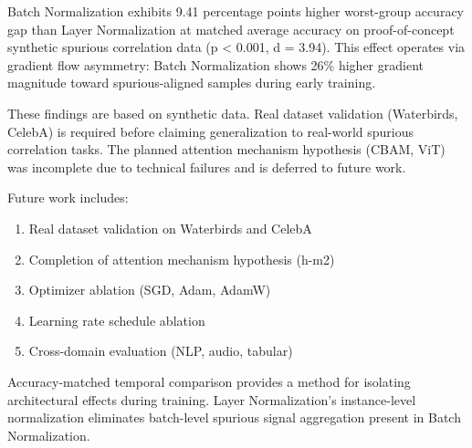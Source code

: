 
Batch Normalization exhibits 9.41 percentage points higher worst-group accuracy gap than Layer Normalization at matched average accuracy on proof-of-concept synthetic spurious correlation data (p < 0.001, d = 3.94). This effect operates via gradient flow asymmetry: Batch Normalization shows 26\% higher gradient magnitude toward spurious-aligned samples during early training.

These findings are based on synthetic data. Real dataset validation (Waterbirds, CelebA) is required before claiming generalization to real-world spurious correlation tasks. The planned attention mechanism hypothesis (CBAM, ViT) was incomplete due to technical failures and is deferred to future work.

Future work includes:
\begin{enumerate}
\item Real dataset validation on Waterbirds and CelebA
\item Completion of attention mechanism hypothesis (h-m2)
\item Optimizer ablation (SGD, Adam, AdamW)
\item Learning rate schedule ablation
\item Cross-domain evaluation (NLP, audio, tabular)
\end{enumerate}

Accuracy-matched temporal comparison provides a method for isolating architectural effects during training. Layer Normalization's instance-level normalization eliminates batch-level spurious signal aggregation present in Batch Normalization.
